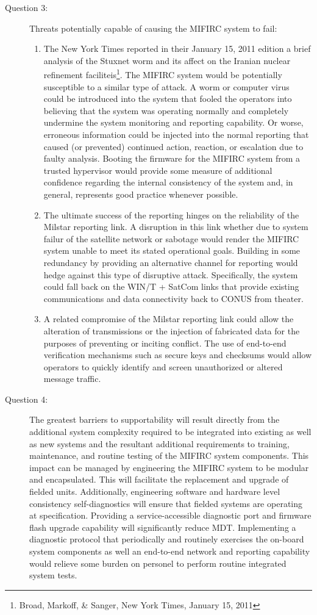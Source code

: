 \documentclass[letterpaper,10pt]{article}
\begin{document}
\begin{description}
\item[Question 3:] Threats potentially capable of causing the MIFIRC system to fail:
	\begin{enumerate}
	\item The New York Times reported in their January 15, 2011 edition a brief analysis of the Stuxnet worm and its affect on the Iranian nuclear refinement faciliteis\footnote{Broad, Markoff, \& Sanger, New York Times, January 15, 2011}.  The MIFIRC system would be potentially susceptible to a similar type of attack. A worm or computer virus could be introduced into the system that fooled the operators into believing that the system was operating normally and completely undermine the system monitoring and reporting capability.  Or worse, erroneous information could be injected into the normal reporting that caused (or prevented) continued action, reaction, or escalation due to faulty analysis.  Booting the firmware for the MIFIRC system from a trusted hypervisor would provide some measure of additional confidence regarding the internal consistency of the system and, in general, represents good practice whenever possible.
	\item The ultimate success of the reporting hinges on the reliability of the Milstar reporting link.  A disruption in this link whether due to system failur of the satellite network or sabotage would render the MIFIRC system unable to meet its stated operational goals.  Building in some redundancy by providing an alternative channel for reporting would hedge against this type of disruptive attack.  Specifically, the system could fall back on the WIN/T + SatCom links that provide existing communications and data connectivity back to CONUS from theater.
	\item A related compromise of the Milstar reporting link could allow the alteration of transmissions or the injection of fabricated data for the purposes of preventing or inciting conflict.  The use of end-to-end verification mechanisms such as secure keys and checksums would allow operators to quickly identify and screen unauthorized or altered message traffic.
	\end{enumerate}

\item[Question 4:]  The greatest barriers to supportability will result directly from the additional system complexity required to be integrated into existing as well as new systems and the resultant additional requirements to training, maintenance, and routine testing of the MIFIRC system components.  This impact can be managed by engineering the MIFIRC system to be modular and encapsulated.  This will facilitate the replacement and upgrade of fielded units.  Additionally, engineering software and hardware level consistency self-diagnostics will ensure that fielded systems are operating at specification.  Providing a service-accessible diagnostic port and firmware flash upgrade capability will significantly reduce MDT.  Implementing a diagnostic protocol that periodically and routinely exercises the on-board system components as well an end-to-end network and reporting capability would relieve some burden on personel to perform routine integrated system tests.


\end{description}
\end{document}
